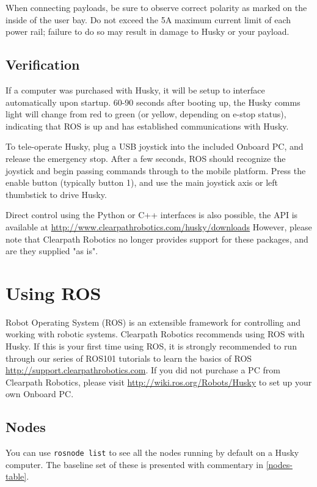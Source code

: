 \documentclass[]{clearpath-latex/clearpath-manual}
\begin{document}
When connecting payloads, be sure to observe correct polarity as marked on the inside of the user bay. 
Do not exceed the 5A maximum current limit of each power rail; failure to do so may result in damage 
to Husky or your payload.

\subsection{Verification}
If a computer was purchased with Husky, it will be setup to interface automatically upon startup. 
60-90 seconds after booting up, the Husky comms light will change from red to green 
(or yellow, depending on e-stop status), indicating that ROS is up and has established communications with Husky.

To tele-operate Husky, plug a USB joystick into the included Onboard PC, and release the emergency stop. 
After a few seconds, ROS should recognize the joystick and begin passing commands through to the mobile platform. 
Press the enable button (typically button 1), and use the main joystick axis or left thumbstick to drive Husky.

Direct control using the Python or C++ interfaces is also possible, the API is available at
\url{http://www.clearpathrobotics.com/husky/downloads} However, please note that Clearpath Robotics no 
longer provides support for these packages, and are they supplied "as is".

\section{Using ROS}
Robot Operating System (ROS) is an extensible framework for controlling and working with robotic systems. 
Clearpath Robotics recommends using ROS with Husky. If this is your first time using ROS, it is strongly 
recommended to run through our series of ROS101 tutorials to learn the basics of ROS 
\url{http://support.clearpathrobotics.com}. If you did not purchase a PC from Clearpath Robotics, please visit \url{http://wiki.ros.org/Robots/Husky} 
to set up your own Onboard PC.

\subsection{Nodes}
You can use \lstinline{rosnode list} to see all the nodes running by default on a Husky computer. 
The baseline set of these is presented with commentary in \autoref{nodes-table}.
\end{document}
